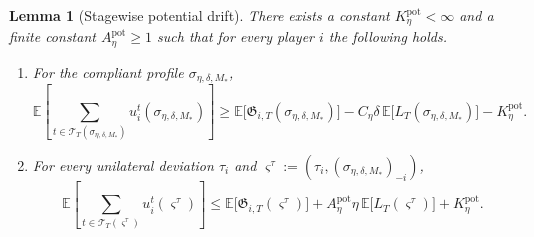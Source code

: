 \documentclass[12pt]{article}
\newtheorem{lemma}[theorem]{Lemma}
\theoremstyle{definition}
\newcommand{\E}{\mathbb{E}}
\newcommand{\1}{\mathbf{1}}
\begin{document}
\begin{lemma}[Stagewise potential drift]
\label{lem:visit-bellman}
There exists a constant $K_\eta^{\mathrm{pot}}<\infty$ and a finite constant
$A_\eta^{\mathrm{pot}}\ge 1$ such that for every player $i$ the following holds.

\begin{enumerate}[label=\textnormal{(\alph*)},leftmargin=2.8em]
\item For the compliant profile $\sigma_{\eta,\delta,M_*}$,
\begin{equation}
\label{eq:stagewise-potential-compliant}
\E\left[
\sum_{t\in\mathcal T_T(\sigma_{\eta,\delta,M_*})}
u_i^t(\sigma_{\eta,\delta,M_*})
\right]
\ge
\E\bigl[\mathfrak G_{i,T}(\sigma_{\eta,\delta,M_*})\bigr]
-
C_\eta\delta\,\E\bigl[L_T(\sigma_{\eta,\delta,M_*})\bigr]
-
K_\eta^{\mathrm{pot}}.
\end{equation}

\item For every unilateral deviation $\tau_i$ and
$\varsigma^\tau:=(\tau_i,(\sigma_{\eta,\delta,M_*})_{-i})$,
\begin{equation}
\label{eq:stagewise-potential-deviator}
\E\left[
\sum_{t\in\mathcal T_T(\varsigma^\tau)}
u_i^t(\varsigma^\tau)
\right]
\le
\E\bigl[\mathfrak G_{i,T}(\varsigma^\tau)\bigr]
+
A_\eta^{\mathrm{pot}}\eta\,
\E\bigl[L_T(\varsigma^\tau)\bigr]
+
K_\eta^{\mathrm{pot}}.
\end{equation}
\end{enumerate}
\end{lemma}
\end{document}
